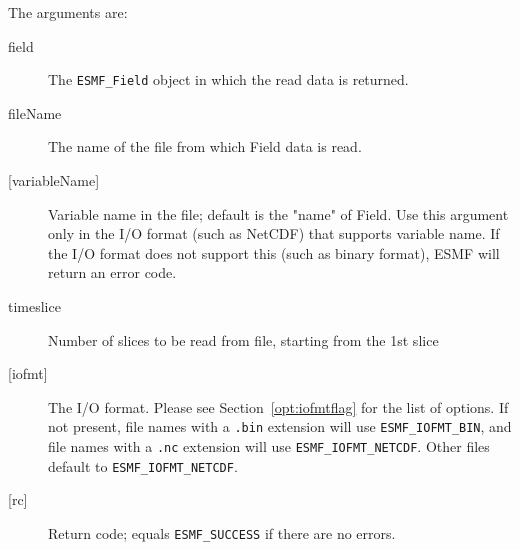      The arguments are:
     \begin{description}
     \item [field]
       The {\tt ESMF\_Field} object in which the read data is returned.
     \item[fileName]
       The name of the file from which Field data is read.
     \item[{[variableName]}]
      Variable name in the file; default is the "name" of Field.
      Use this argument only in the I/O format (such as NetCDF) that
      supports variable name. If the I/O format does not support this
      (such as binary format), ESMF will return an error code.
     \item[timeslice]
       Number of slices to be read from file, starting from the 1st slice
     \item[{[iofmt]}]
       \begin{sloppypar}
      The I/O format.  Please see Section~\ref{opt:iofmtflag} for the list
      of options. If not present, file names with a {\tt .bin} extension will
      use {\tt ESMF\_IOFMT\_BIN}, and file names with a {\tt .nc} extension
      will use {\tt ESMF\_IOFMT\_NETCDF}.  Other files default to
      {\tt ESMF\_IOFMT\_NETCDF}.
       \end{sloppypar}
     \item [{[rc]}]
       Return code; equals {\tt ESMF\_SUCCESS} if there are no errors.
     \end{description}
  
\setlength{\parskip}{\oldparskip}
\setlength{\parindent}{\oldparindent}
\setlength{\baselineskip}{\oldbaselineskip}
